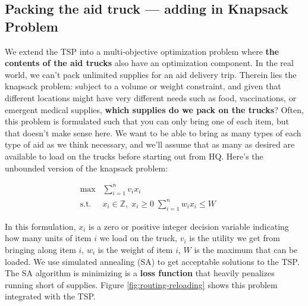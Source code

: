 \documentclass[a0,final]{a0poster}
\begin{document}
\begin{multicols}{3}
\columnbreak



\subsection*{Packing the aid truck --- adding in Knapsack Problem}

\vspace{-6mm}

We extend the TSP into a multi-objective optimization problem
where \textbf{the contents of the aid trucks} also have an optimization component. In the real world, we can't pack unlimited supplies for an aid delivery trip. Therein lies
the knapsack problem: subject to a volume or weight constraint, and given that different locations
might have very different needs such as food, vaccinations, or emergent medical supplies, \textbf{which supplies do we pack on the trucks}?  Often, this problem is formulated such that you can only bring one of each item, but that doesn't make sense here. We want to be able to bring as many types of each type of aid as we think necessary, and we'll assume that as many as desired are available to load on the trucks before starting out from HQ. Here's the unbounded version of the knapsack problem:

\begin{align*}
\max &\sum_{i=1}^n v_i x_i &&  \\
\mathrm{s.t.} \; \; & x_i \in \mathbb{Z}, \; x_i \geq 0 \; \sum_{i=1}^n w_ix_i \leq W
\end{align*}

\noindent In this formulation, $x_{i}$ is a zero or positive integer decision variable indicating how many units of item $i$ we load on the truck, $v_i$ is the utility we get from bringing along item $i$, $w_i$ is the weight of item $i$, $W$ is the maximum that can be loaded. We use simulated annealing (SA) to get acceptable solutions to the TSP. The SA algorithm is minimizing is a \textbf{loss function} that heavily penalizes running short of supplies. Figure \ref{fig:routing-reloading} shows this problem integrated with the TSP.

\vspace{-6mm}


\end{multicols}
\end{document}

